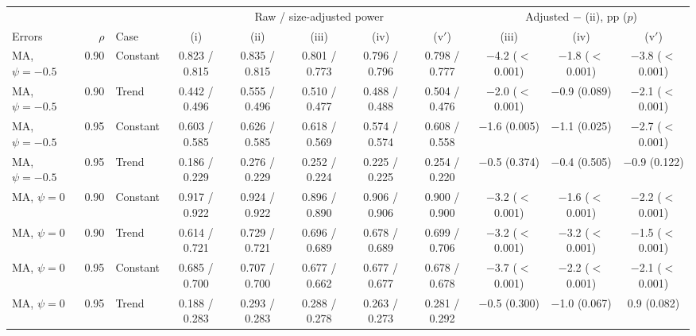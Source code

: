 \begin{tabular}{lrlcccccccc}
\toprule
& & & \multicolumn{5}{c}{Raw / size-adjusted power} & \multicolumn{3}{c}{Adjusted $-$ (ii), pp ($p$)} \\
\cmidrule(lr){4-8}\cmidrule(lr){9-11}
Errors & $\rho$ & Case & (i) & (ii) & (iii) & (iv) & (v$'$) & (iii) & (iv) & (v$'$) \\
\midrule
MA, $\psi = -0.5$ & 0.90 & Constant & 0.823 / 0.815 & 0.835 / 0.815 & 0.801 / 0.773 & 0.796 / 0.796 & 0.798 / 0.777 & $-$4.2 ($<$0.001) & $-$1.8 ($<$0.001) & $-$3.8 ($<$0.001) \\
MA, $\psi = -0.5$ & 0.90 & Trend & 0.442 / 0.496 & 0.555 / 0.496 & 0.510 / 0.477 & 0.488 / 0.488 & 0.504 / 0.476 & $-$2.0 ($<$0.001) & $-$0.9 (0.089) & $-$2.1 ($<$0.001) \\
MA, $\psi = -0.5$ & 0.95 & Constant & 0.603 / 0.585 & 0.626 / 0.585 & 0.618 / 0.569 & 0.574 / 0.574 & 0.608 / 0.558 & $-$1.6 (0.005) & $-$1.1 (0.025) & $-$2.7 ($<$0.001) \\
MA, $\psi = -0.5$ & 0.95 & Trend & 0.186 / 0.229 & 0.276 / 0.229 & 0.252 / 0.224 & 0.225 / 0.225 & 0.254 / 0.220 & $-$0.5 (0.374) & $-$0.4 (0.505) & $-$0.9 (0.122) \\
\addlinespace
MA, $\psi = 0$ & 0.90 & Constant & 0.917 / 0.922 & 0.924 / 0.922 & 0.896 / 0.890 & 0.906 / 0.906 & 0.900 / 0.900 & $-$3.2 ($<$0.001) & $-$1.6 ($<$0.001) & $-$2.2 ($<$0.001) \\
MA, $\psi = 0$ & 0.90 & Trend & 0.614 / 0.721 & 0.729 / 0.721 & 0.696 / 0.689 & 0.678 / 0.689 & 0.699 / 0.706 & $-$3.2 ($<$0.001) & $-$3.2 ($<$0.001) & $-$1.5 ($<$0.001) \\
MA, $\psi = 0$ & 0.95 & Constant & 0.685 / 0.700 & 0.707 / 0.700 & 0.677 / 0.662 & 0.677 / 0.677 & 0.678 / 0.678 & $-$3.7 ($<$0.001) & $-$2.2 ($<$0.001) & $-$2.1 ($<$0.001) \\
MA, $\psi = 0$ & 0.95 & Trend & 0.188 / 0.283 & 0.293 / 0.283 & 0.288 / 0.278 & 0.263 / 0.273 & 0.281 / 0.292 & $-$0.5 (0.300) & $-$1.0 (0.067) & 0.9 (0.082) \\
\bottomrule
\end{tabular}
